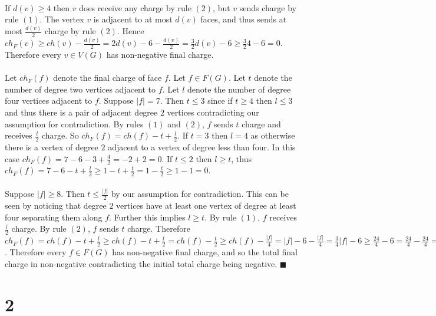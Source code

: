 \documentclass[letterpaper,12pt,oneside,onecolumn]{report}
\begin{document}
\paragraph{} 
If $d(v) \geq 4$ then $v$ does receive any charge by rule $(2)$, but $v$ sends charge by rule $(1)$. The vertex $v$ is adjacent to at most $d(v)$ faces, and thus sends at most $\frac{d(v)}{2}$ charge by rule $(2)$. Hence $ch_F(v) \geq ch(v) - \frac{d(v)}{2} = 2d(v) - 6 - \frac{d(v)}{2} = \frac{3}{2}d(v) - 6 \geq \frac{3}{2}4 - 6 = 0$. Therefore every $v \in V(G)$ has non-negative final charge.
\paragraph{}
Let $ch_F(f)$ denote the final charge of face $f$. Let $f \in F(G)$. Let $t$ denote the number of degree two vertices adjacent to $f$. Let $l$ denote the number of degree four vertices adjacent to $f$. Suppose $|f| = 7$. Then $t \leq 3$ since if $t \geq 4$ then $l\leq 3$ and thus there is a pair of adjacent degree $2$ vertices contradicting our assumption for contradiction. By rules $(1)$ and $(2)$, $f$ sends $t$ charge and receives $\frac{l}{2}$ charge. So $ch_F(f) = ch(f) - t + \frac{l}{2}$. If $t = 3$ then $l = 4$ as otherwise there is a vertex of degree $2$ adjacent to a vertex of degree less than four. In this case $ch_F(f) = 7 - 6 - 3 + \frac{4}{2} = -2 + 2 = 0$. If $t \leq 2$ then $l \geq t$, thus $ch_F(f) = 7 - 6 - t + \frac{l}{2} \geq 1 - t + \frac{t}{2} = 1 -\frac{t}{2} \geq 1 - 1 = 0$.
\paragraph{}
Suppose $|f| \geq 8$. Then $t \leq \frac{|f|}{2}$ by our assumption for contradiction. This can be seen by noticing that degree $2$ vertices have at least one vertex of degree at least four separating them along $f$. Further this implies $l \geq t$. By rule $(1)$, $f$ receives $\frac{l}{2}$ charge. By rule $(2)$, $f$ sends $t$ charge. Therefore $ch_F(f) = ch(f) - t + \frac{l}{2} \geq ch(f) - t + \frac{t}{2} = ch(f) - \frac{t}{2} \geq ch(f) - \frac{|f|}{4} = |f| - 6 - \frac{|f|}{4} = \frac{3}{4}|f| - 6 \geq \frac{24}{4} - 6 = \frac{24}{4} - \frac{24}{4} = 0$. Therefore every $f \in F(G)$ has non-negative final charge, and so the total final charge in non-negative contradicting the initial total charge being negative. $\blacksquare$

\section*{2}
\end{document}
